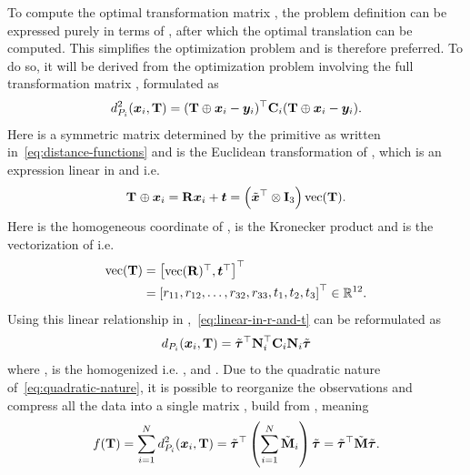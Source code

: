 To compute the optimal transformation matrix \tf[T]{\star}{}, the problem definition can be expressed purely in terms of \tf[R]{}{}, after which the optimal translation  can be computed. This simplifies the optimization problem and is therefore preferred. To do so, it will be derived from the optimization problem involving the full transformation matrix \tf[T]{}{}, formulated as
%
\begin{equation}\label{eq:linear-in-r-and-t}
	d_{P_i}^2(\vec{x}_i, \mat{T})=(\mat{T}\oplus \vec{x}_i - \vec{y}_i)^\T\mat{C}_i (\mat{T}\oplus \vec{x}_i - \vec{y}_i).
\end{equation}
Here  is a symmetric matrix determined by the primitive as written in~\eqref{eq:distance-functions} and  is the Euclidean transformation of , which is an expression linear in \tf[R]{}{} and  i.e.
%
\begin{equation}
	\tf[T]{}{} \oplus \vec{x}_i = \mat{R}\vec{x}_i + \vec{t} = \left( \tilde{\vec{x}}^\T \otimes \mat{I}_3\right) \text{vec}(\mat{T}).
\end{equation}
Here  is the homogeneous coordinate of , \mvar{\otimes} is the Kronecker product and  is the vectorization of  i.e.
%
\begin{align}
	\text{vec}(\mat{T}) &= \rvec{\text{vec}(\mat{R})^\T, \vec{t}^\T}^\T \\
	&= \rvec{r_{11},r_{12},\dots,r_{32},r_{33},t_{1},t_{2},t_{3}}^\T \inR{12}.
\end{align}
Using this linear relationship in ,~\eqref{eq:linear-in-r-and-t} can be reformulated as 
%
\begin{equation}\label{eq:quadratic-nature}
	d_{P_i}(\vec{x}_i,\mat{T})=\tilde{\vec{\tau}}^\T \mat{N}_i^\T \mat{C}_i \mat{N}_i \tilde{\vec{\tau}}
\end{equation}
where , \mvar{\tilde{\vec{\tau}}} is the homogenized  i.e. , and . Due to the quadratic nature of~\eqref{eq:quadratic-nature}, it is possible to reorganize the observations and compress all the data into a single matrix , build from , meaning 
%
\begin{equation}
	f(\mat{T})=\sum^N_{i=1} d_{P_i}^2(\vec{x}_i,\mat{T})=\tilde{\vec{\tau}}^\T \left( \sum^N_{i=1} \tilde{\mat{M}}_i \right) \tilde{\vec{\tau}} = \tilde{\vec{\tau}}^\T \tilde{\mat{M}} \tilde{\vec{\tau}}.
\end{equation}
